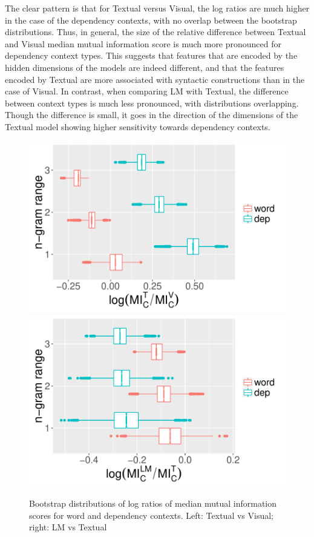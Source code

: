 The clear pattern is that for {\sc Textual} versus {\sc Visual}, the
log ratios are much higher in the case of the dependency contexts,
with no overlap between the bootstrap distributions. Thus, in general,
the size of the relative difference between {\sc Textual} and {\sc
  Visual} median mutual information score is much more pronounced for
dependency context types.  This suggests that features that are
encoded by the hidden dimensions of the models are indeed different, and
that the features encoded by {\sc Textual} are more associated with
syntactic constructions than in the case of {\sc Visual}. In contrast,
when comparing {\sc LM} with {\sc Textual}, the difference between
context types is much less pronounced, with distributions
overlapping. Though the difference is small, it goes in the direction
of the dimensions of the {\sc Textual} model showing higher
sensitivity towards dependency contexts.

\begin{figure}
  \centering
  \includegraphics[scale=0.4]{chapters/COLI/bootstrappedMI.pdf}
  \includegraphics[scale=0.4]{chapters/COLI/bootstrappedMI2.pdf}
  \caption{Bootstrap distributions of log ratios of median mutual
    information scores for word and dependency contexts. Left: {\sc Textual}
      vs {\sc Visual}; right: {\sc LM} vs {\sc Textual}}
  \label{fig:mi-boot}
  \vspace{-.2cm}
\end{figure}



